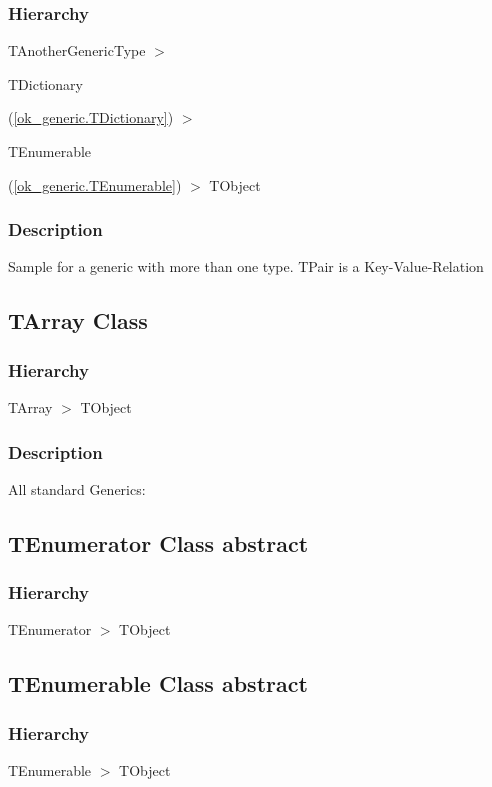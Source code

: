 \documentclass{report}
\begin{document}
\subsubsection*{\large{\textbf{Hierarchy}}\normalsize\hspace{1ex}\hfill}
TAnotherGenericType {$>$} \begin{ttfamily}TDictionary\end{ttfamily}(\ref{ok_generic.TDictionary}) {$>$} \begin{ttfamily}TEnumerable\end{ttfamily}(\ref{ok_generic.TEnumerable}) {$>$} 
TObject
\subsubsection*{\large{\textbf{Description}}\normalsize\hspace{1ex}\hfill}
Sample for a generic with more than one type. TPair is a Key{-}Value{-}Relation\subsection*{TArray Class}
\subsubsection*{\large{\textbf{Hierarchy}}\normalsize\hspace{1ex}\hfill}
TArray {$>$} TObject
\subsubsection*{\large{\textbf{Description}}\normalsize\hspace{1ex}\hfill}
All standard Generics:\subsection*{TEnumerator Class abstract}
\subsubsection*{\large{\textbf{Hierarchy}}\normalsize\hspace{1ex}\hfill}
TEnumerator {$>$} TObject
\subsection*{TEnumerable Class abstract}
\subsubsection*{\large{\textbf{Hierarchy}}\normalsize\hspace{1ex}\hfill}
TEnumerable {$>$} TObject
\end{document}
